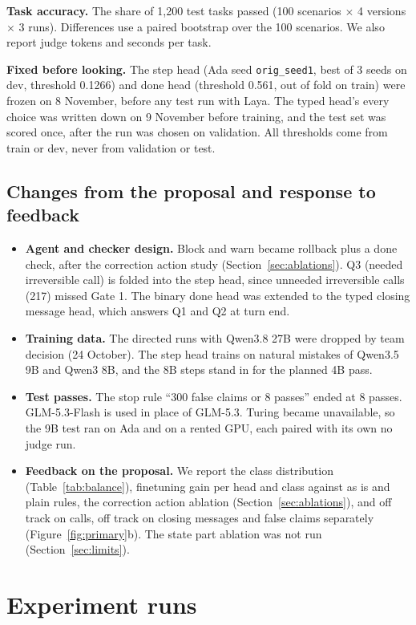 \documentclass[10pt,a4paper]{article}
\newcommand{\code}[1]{\texttt{#1}}
\begin{document}
\textbf{Task accuracy.} The share of 1,200 test tasks passed (100 scenarios $\times$ 4 versions $\times$ 3 runs). Differences use a paired bootstrap over the 100 scenarios. We also report judge tokens and seconds per task.

\textbf{Fixed before looking.} The step head (Ada seed \code{orig\_seed1}, best of 3 seeds on dev, threshold 0.1266) and done head (threshold 0.561, out of fold on train) were frozen on 8 November, before any test run with Laya. The typed head's every choice was written down on 9 November before training, and the test set was scored once, after the run was chosen on validation. All thresholds come from train or dev, never from validation or test.

\subsection{Changes from the proposal and response to feedback}\label{sec:changes}
\begin{itemize}
  \item \textbf{Agent and checker design.} Block and warn became rollback plus a done check, after the correction action study (Section~\ref{sec:ablations}). Q3 (needed irreversible call) is folded into the step head, since unneeded irreversible calls (217) missed Gate 1. The binary done head was extended to the typed closing message head, which answers Q1 and Q2 at turn end.
  \item \textbf{Training data.} The directed runs with Qwen3.8 27B were dropped by team decision (24 October). The step head trains on natural mistakes of Qwen3.5 9B and Qwen3 8B, and the 8B steps stand in for the planned 4B pass.
  \item \textbf{Test passes.} The stop rule ``300 false claims or 8 passes'' ended at 8 passes. GLM-5.3-Flash is used in place of GLM-5.3. Turing became unavailable, so the 9B test ran on Ada and on a rented GPU, each paired with its own no judge run.
  \item \textbf{Feedback on the proposal.} We report the class distribution (Table~\ref{tab:balance}), finetuning gain per head and class against as is and plain rules, the correction action ablation (Section~\ref{sec:ablations}), and off track on calls, off track on closing messages and false claims separately (Figure~\ref{fig:primary}b). The state part ablation was not run (Section~\ref{sec:limits}).
\end{itemize}

\section{Experiment runs}\label{sec:experiments}
\end{document}
